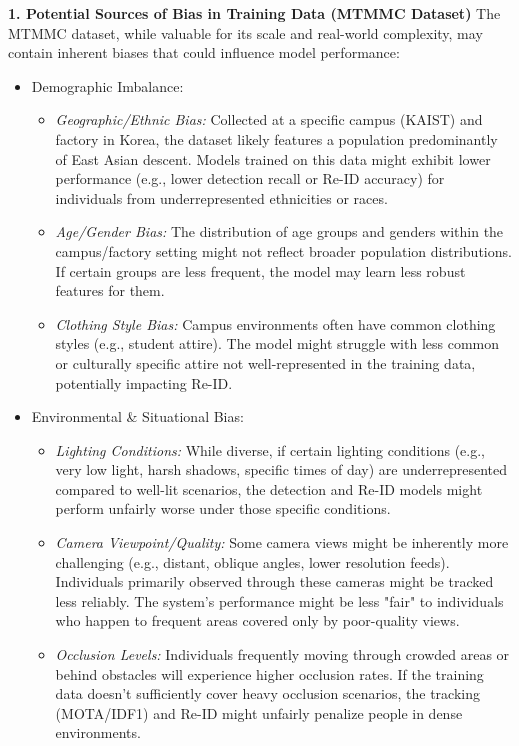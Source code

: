 \textbf{1. Potential Sources of Bias in Training Data (MTMMC Dataset)}
The MTMMC dataset, while valuable for its scale and real-world complexity, may contain inherent biases that could influence model performance:
\begin{itemize}
    \item Demographic Imbalance:
    \begin{itemize}
        \item \textit{Geographic/Ethnic Bias:} Collected at a specific campus (KAIST) and factory in Korea, the dataset likely features a population predominantly of East Asian descent. Models trained on this data might exhibit lower performance (e.g., lower detection recall or Re-ID accuracy) for individuals from underrepresented ethnicities or races.
        \item \textit{Age/Gender Bias:} The distribution of age groups and genders within the campus/factory setting might not reflect broader population distributions. If certain groups are less frequent, the model may learn less robust features for them.
        \item \textit{Clothing Style Bias:} Campus environments often have common clothing styles (e.g., student attire). The model might struggle with less common or culturally specific attire not well-represented in the training data, potentially impacting Re-ID.
    \end{itemize}
    \item Environmental \& Situational Bias:
    \begin{itemize}
        \item \textit{Lighting Conditions:} While diverse, if certain lighting conditions (e.g., very low light, harsh shadows, specific times of day) are underrepresented compared to well-lit scenarios, the detection and Re-ID models might perform unfairly worse under those specific conditions.
        \item \textit{Camera Viewpoint/Quality:} Some camera views might be inherently more challenging (e.g., distant, oblique angles, lower resolution feeds). Individuals primarily observed through these cameras might be tracked less reliably. The system's performance might be less "fair" to individuals who happen to frequent areas covered only by poor-quality views.
        \item \textit{Occlusion Levels:} Individuals frequently moving through crowded areas or behind obstacles will experience higher occlusion rates. If the training data doesn't sufficiently cover heavy occlusion scenarios, the tracking (MOTA/IDF1) and Re-ID might unfairly penalize people in dense environments.

\end{itemize}
\end{itemize}
